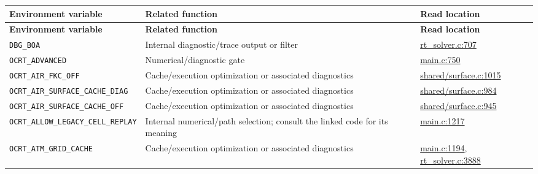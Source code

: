 {\TableFont
\begin{longtable}{@{}>{\raggedright\arraybackslash}p{}>{\raggedright\arraybackslash}p{}>{\raggedright\arraybackslash}p{}@{}}
\toprule
\textbf{Environment variable} & \textbf{Related function} & \textbf{Read location} \\
\midrule
\endfirsthead
\toprule
\textbf{Environment variable} & \textbf{Related function} & \textbf{Read location} \\
\midrule
\endhead
\bottomrule
\endfoot
\texttt{DBG\_\allowbreak{}BOA} & Internal diagnostic/trace output or filter & \href{https://github.com/brtnt/OCRT/blob/54861c68e35ec5aaa3938fad53e93dc2dfa7eb1d/code/OCRT_C/src/rt_solver.c\#L707}{rt\_solver.c:707} \\
\texttt{OCRT\_\allowbreak{}ADVANCED} & Numerical/diagnostic gate & \href{https://github.com/brtnt/OCRT/blob/54861c68e35ec5aaa3938fad53e93dc2dfa7eb1d/code/OCRT_C/src/main.c\#L750}{main.c:750} \\
\texttt{OCRT\_\allowbreak{}AIR\_\allowbreak{}FKC\_\allowbreak{}OFF} & Cache/execution optimization or associated diagnostics & \href{https://github.com/brtnt/OCRT/blob/54861c68e35ec5aaa3938fad53e93dc2dfa7eb1d/code/OCRT_C/src/shared/surface.c\#L1015}{shared/surface.c:1015} \\
\texttt{OCRT\_\allowbreak{}AIR\_\allowbreak{}SURFACE\_\allowbreak{}CACHE\_\allowbreak{}DIAG} & Cache/execution optimization or associated diagnostics & \href{https://github.com/brtnt/OCRT/blob/54861c68e35ec5aaa3938fad53e93dc2dfa7eb1d/code/OCRT_C/src/shared/surface.c\#L984}{shared/surface.c:984} \\
\texttt{OCRT\_\allowbreak{}AIR\_\allowbreak{}SURFACE\_\allowbreak{}CACHE\_\allowbreak{}OFF} & Cache/execution optimization or associated diagnostics & \href{https://github.com/brtnt/OCRT/blob/54861c68e35ec5aaa3938fad53e93dc2dfa7eb1d/code/OCRT_C/src/shared/surface.c\#L945}{shared/surface.c:945} \\
\texttt{OCRT\_\allowbreak{}ALLOW\_\allowbreak{}LEGACY\_\allowbreak{}CELL\_\allowbreak{}REPLAY} & Internal numerical/path selection; consult the linked code for its meaning & \href{https://github.com/brtnt/OCRT/blob/54861c68e35ec5aaa3938fad53e93dc2dfa7eb1d/code/OCRT_C/src/main.c\#L1217}{main.c:1217} \\
\texttt{OCRT\_\allowbreak{}ATM\_\allowbreak{}GRID\_\allowbreak{}CACHE} & Cache/execution optimization or associated diagnostics & \href{https://github.com/brtnt/OCRT/blob/54861c68e35ec5aaa3938fad53e93dc2dfa7eb1d/code/OCRT_C/src/main.c\#L1194}{main.c:1194}, \href{https://github.com/brtnt/OCRT/blob/54861c68e35ec5aaa3938fad53e93dc2dfa7eb1d/code/OCRT_C/src/rt_solver.c\#L3888}{rt\_solver.c:3888} \\

\end{longtable}}
